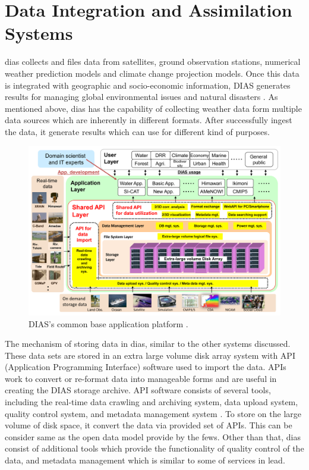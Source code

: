 \section{Data Integration and Assimilation Systems}
\label{se:dias}

\acrshort{dias} collects and files data from satellites, ground observation stations, numerical weather prediction models and climate change projection models. Once this data is integrated with geographic and socio-economic information, DIAS generates results for managing global environmental issues and natural disasters \cite{Kawasaki2018DataReduction}. As mentioned above, \acrshort{dias} has the capability of collecting weather data form multiple data sources which are inherently in different formats. After successfully ingest the data, it generate results which can use for different kind of purposes.

\begin{figure}[htp]
    \centering
    \includegraphics[width=1\textwidth]{lit/other/dias_common_base_application_platform.png}
    \caption[DIAS’s common base application platform.]{DIAS’s common base application platform \cite{Kawasaki2018DataReduction}.}
    \label{fi:dias_common_platform}
\end{figure}

The mechanism of storing data in \acrshort{dias}, similar to the other systems discussed.
These data sets are stored in an extra large volume disk array system with API (Application Programming Interface) software used to import the data. APIs work to convert or re-format data into manageable forms and are useful in creating the DIAS storage archive. API software consists of several tools, including the real-time data crawling and archiving system, data upload system, quality control system, and metadata management system \cite{Kawasaki2018DataReduction}. To store on the large volume of disk space, it convert the data via provided set of APIs. This can be consider same as the open data model provide by the \acrshort{fews}. Other than that, \acrshort{dias} consist of additional tools which provide the functionality of quality control of the data, and metadata management which is similar to some of services in \acrshort{lead}.

